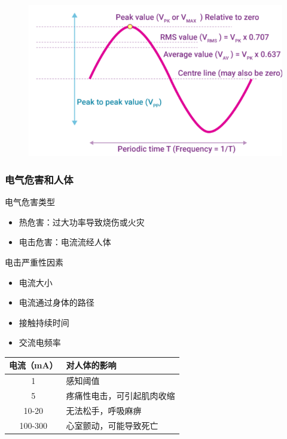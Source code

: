 \documentclass{beamer}
\begin{document}
\begin{frame}
    \begin{figure}
        \centering
        \includegraphics[width=0.75\linewidth]{rms.png}
    \end{figure}
\end{frame}

\begin{frame}
    \frametitle{电气危害和人体}
    \begin{block}{电气危害类型}
        \begin{itemize}
            \item 热危害：过大功率导致烧伤或火灾
            \item 电击危害：电流流经人体
        \end{itemize}
    \end{block}
    \begin{block}{电击严重性因素}
        \begin{itemize}
            \item 电流大小
            \item 电流通过身体的路径
            \item 接触持续时间
            \item 交流电频率
        \end{itemize}
    \end{block}
    \begin{center}
        \begin{tabular}{|c|l|}
            \hline
            \textbf{电流（mA）} & \textbf{对人体的影响} \\
            \hline
            1 & 感知阈值 \\
            5 & 疼痛性电击，可引起肌肉收缩 \\
            10-20 & 无法松手，呼吸麻痹 \\
            100-300 & 心室颤动，可能导致死亡 \\
            \hline
        \end{tabular}
    \end{center}
\end{frame}
\end{document}
